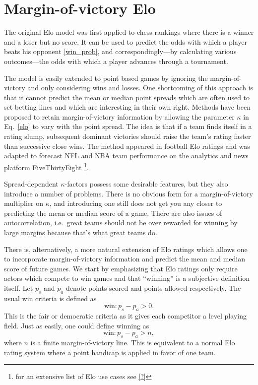 \documentclass[aps,prc,reprint,amsmath,superscriptaddress]{revtex4-1}
\begin{document}
\section{Margin-of-victory Elo}

The original Elo model was first applied to chess rankings where there is a winner and a loser but no score.
It can be used to predict the odds with which a player beats his opponent \eqref{win_prob}, and correspondingly---by calculating various outcomes---the odds with which a player advances through a tournament. 

The model is easily extended to point based games by ignoring the margin-of-victory and only considering wins and losses.
One shortcoming of this approach is that it cannot predict the mean or median point spreads which are often used to set betting lines and which are interesting in their own right.
Methods have been proposed to retain margin-of-victory information by allowing the parameter $\kappa$ in Eq.~\eqref{elo} to vary with the point spread.
The idea is that if a team finds itself in a rating slump, subsequent dominant victories should raise the team's rating faster than successive close wins.
The method appeared in football Elo ratings \cite{?} and was adapted to forecast NFL and NBA team performance on the analytics and news platform FiveThirtyEight \footnote{for an extensive list of Elo use cases see \ref{?}}.

Spread-dependent $\kappa$-factors possess some desirable features, but they also introduce a number of problems.
There is no obvious form for a margin-of-victory multiplier on $\kappa$, and introducing one still does not get you any closer to predicting the mean or median score of a game.
There are also issues of autocorrelation, i.e.\ great teams should not be over rewarded for winning by large margins because that's what great teams do.

There is, alternatively, a more natural extension of Elo ratings which allows one to incorporate margin-of-victory information and predict the mean and median score of future games.
We start by emphasizing that Elo ratings only require actors which compete to win games and that ``winning'' is a subjective definition itself.
Let $p_s$ and $p_a$ denote points scored and points allowed respectively.
The usual win criteria is defined as
\begin{equation}
  \text{win}: p_s - p_a > 0.
\end{equation}
This is the fair or democratic criteria as it gives each competitor a level playing field.
Just as easily, one could define winning as
\begin{equation}
  \text{win}: p_s - p_a > n,
\end{equation}
where $n$ is a finite margin-of-victory line.
This is equivalent to a normal Elo rating system where a point handicap is applied in favor of one team.
\end{document}
